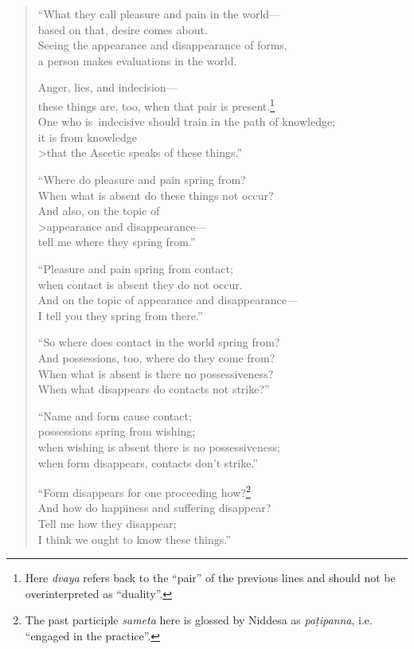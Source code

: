 \documentclass[12pt,openany]{book}%
\begin{document}
\begin{verse}
“What they call pleasure and pain in the world—\\
based on that, desire comes about. \\
Seeing the appearance and disappearance of forms, \\
a person makes evaluations in the world. 

Anger, lies, and indecision—\\
these things are, too, when that pair is present.\footnote{Here \textit{dvaya} refers back to the “pair” of the previous lines and should not be overinterpreted as “duality”. } \\
One who is indecisive should train in the path of knowledge; \\
it is from knowledge \\>that the Ascetic speaks of these things.” 

“Where do pleasure and pain spring from? \\
When what is absent do these things not occur? \\
And also, on the topic of \\>appearance and disappearance—\\
tell me where they spring from.” 

“Pleasure and pain spring from contact; \\
when contact is absent they do not occur. \\
And on the topic of appearance and disappearance—\\
I tell you they spring from there.” 

“So where does contact in the world spring from? \\
And possessions, too, where do they come from? \\
When what is absent is there no possessiveness? \\
When what disappears do contacts not strike?” 

“Name and form cause contact; \\
possessions spring from wishing; \\
when wishing is absent there is no possessiveness; \\
when form disappears, contacts don’t strike.” 

“Form disappears for one proceeding how?\footnote{The past participle \textit{sameta} here is glossed by Niddesa as \textit{\textsanskrit{paṭipanna}}, i.e. “engaged in the practice”. } \\
And how do happiness and suffering disappear? \\
Tell me how they disappear; \\
I think we ought to know these things.” 


\end{verse}
\end{document}
